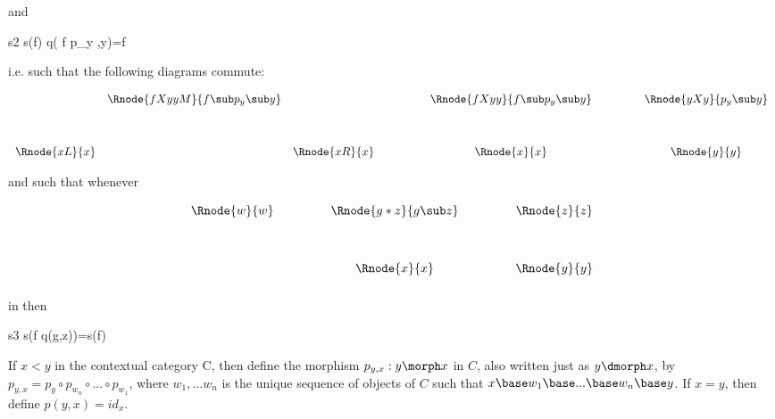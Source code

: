 \noindent and

\begin{axiom}{s2}
s(f) \circ q( f \circ p_y     ,y)=f
\end{axiom}	

\noindent i.e. such that the following diagrams commute:
\begin{center}
\begin{displaymath}
\begin{array}{cccp{1.cm} cp{.9cm}c}
&\Rnode{fXyyM}{f\sub p_y \sub y}&  & &  \Rnode{fXyy}{f\sub p_y \sub y} & & \Rnode{yXy}{p_y \sub y}\\ [1.2cm]
\Rnode{xL}{x} & &\Rnode{xR}{x} & &\Rnode{x}{x}         & & \Rnode{y}{y}
\end{array}
\end{displaymath}
\end{center}

\noindent
and such that whenever

\begin{center}
\begin{displaymath}
\begin{array}{c p{.9cm} c p{.9cm} c}
\Rnode{w}{w}&& \Rnode{g*z}{g \sub z} && \Rnode{z}{z} \\ [1.2cm]
            && \Rnode{x}{x}  && \Rnode{y}{y} \\ [0.2cm]
\end{array}
\end{displaymath}
\end{center}

\noindent in  then

\begin{axiom}{s3}
s(f \circ q(g,z))=s(f)
\end{axiom}


\note  If $x < y$ in the contextual category C, then define the morphism 
$p_{y,x}:y \morph  x$ in $C$, also written just as $y \dmorph x$, 
by $p_{y,x}=p_y\circ p_{w_n} \circ ... \circ p_{w_1}$, 
where
$w_1, ... w_n$ is the unique sequence of objects of $C$ such that 
$x \base w_1 \base ... \base w_n \base y$. If $x = y$, then define $p(y, x) = id_x$.\\

